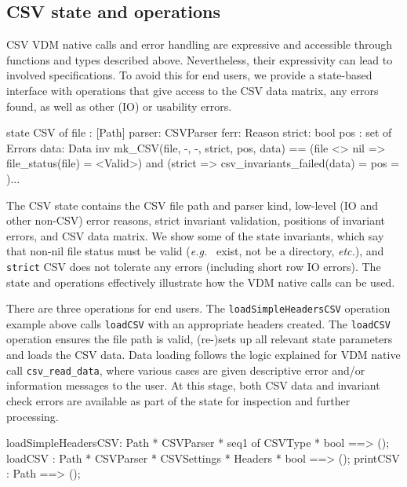 \documentclass[runningheads,a4paper]{llncs}
\begin{document}
\subsection*{CSV state and operations}\label{subsec:StateOps}

CSV VDM native calls and error handling are expressive and accessible through functions and types described above. Nevertheless, their expressivity can lead to involved specifications. To avoid this for end users, we provide a state-based interface with operations that give access to the CSV data matrix, any errors found, as well as other (IO) or usability errors.     
%
\begin{vdmsl}[frame=none,basicstyle=\ttfamily\scriptsize]
    state CSV of 
        file  : [Path]   parser: CSVParser       ferr: Reason
        strict: bool     pos   : set of Errors   data: Data
    inv mk_CSV(file, -, -, strict, pos, data) == 
       (file <> nil => file_status(file) = <Valid>) and
       (strict => csv_invariants_failed(data) = pos = {})...
\end{vdmsl}
%
The CSV state contains the CSV file path and parser kind, low-level (IO and other non-CSV) error reasons, strict invariant validation, positions of invariant errors, and CSV data matrix. We show some of the state invariants, which say that non-nil file status must be valid (\textit{e.g.~} exist, not be a directory, \textit{etc.}), and \texttt{strict} CSV does not tolerate any errors (including short row IO errors). The state and operations effectively illustrate how the VDM native calls can be used.     

There are three operations for end users. The \texttt{loadSimpleHeadersCSV} operation example above calls \texttt{loadCSV} with an appropriate headers created. The \texttt{loadCSV} operation ensures the file path is valid, (re-)sets up all relevant state parameters and loads the CSV data. Data loading follows the logic explained for VDM native call \texttt{csv\_read\_data}, where various cases are given descriptive error and/or information messages to the user. At this stage, both CSV data and invariant check errors are available as part of the state for inspection and further processing.  
%
\begin{vdmsl}[frame=none,basicstyle=\scriptsize\ttfamily]
    loadSimpleHeadersCSV: Path * CSVParser * seq1 of CSVType * bool ==> ();
    loadCSV       : Path * CSVParser * CSVSettings * Headers * bool ==> ();
    printCSV      : Path ==> ();
\end{vdmsl}
\end{document}
